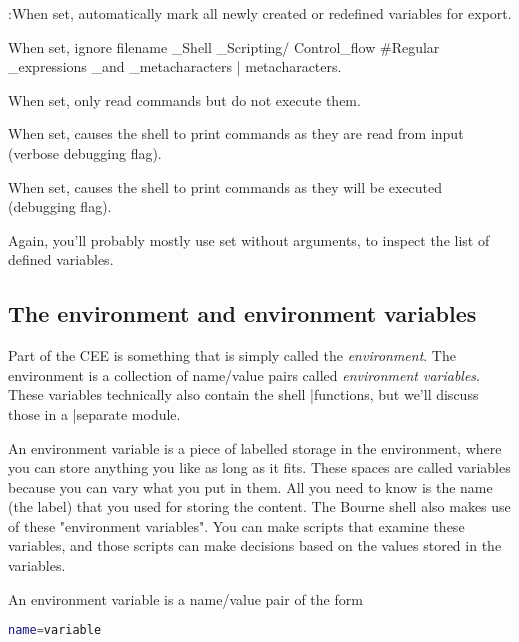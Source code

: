 \begin{description}
\setlength{\leftmargin}{0pt}
\setlength{\itemsep}{0pt}
\setlength{\parsep}{0pt}
\setlength{\parskip}{0pt}
\item[+/-a]:When set, automatically mark all newly created or redefined variables for export.
\item[+/-f]When set, ignore filename \_Shell \_Scripting/ Control\_flow \#Regular \_expressions \_and \_metacharacters | metacharacters.
\item[+/-n]When set, only read commands but do not execute them.
\item[+/-v]When set, causes the shell to print commands as they are read from input (verbose debugging flag).
\item[+/-x]When set, causes the shell to print commands as they will be executed (debugging flag).
\end{description}

Again, you'll probably mostly use set without arguments, to inspect the list of
defined variables.

\subsection{The environment and environment variables}
Part of the CEE is something that is simply called the \textit{environment}.
The environment is a collection of name/value pairs called \textit{environment variables}.
These variables technically also contain the shell |functions, but
we'll discuss those in a |separate module.

An environment variable is a piece of labelled storage in the environment,
where you can store anything you like as long as it fits. These spaces are
called variables because you can vary what you put in them. All you need to
know is the name (the label) that you used for storing the content. The Bourne
shell also makes use of these "environment variables". You can make scripts
that examine these variables, and those scripts can make decisions based on the
values stored in the variables.

An environment variable is a name/value pair of the form
\lstset{basicstyle=\scriptsize, numbers=left, captionpos=b, tabsize=4}
\begin{lstlisting}[language={bash},
xleftmargin=15pt]
name=variable
\end{lstlisting}

